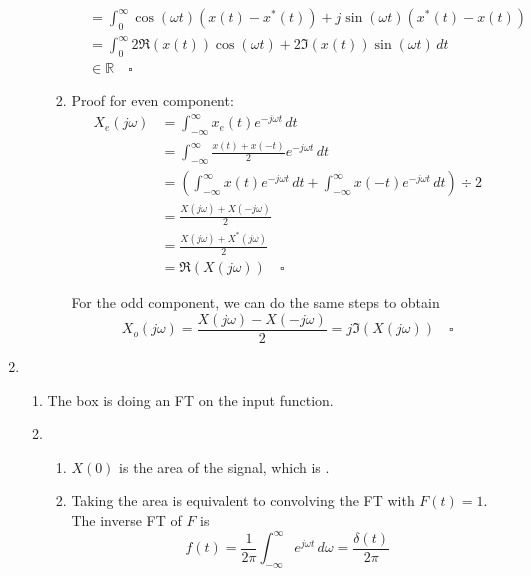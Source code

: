 \documentclass[12pt]{article}
\begin{document}
\begin{enumerate}
\begin{enumerate}
\begin{enumerate}
\[\begin{aligned}
                                                 & = \int_{0}^{\infty} \cos(\omega t)(x(t)-x^*(t))+j\sin(\omega t)(x^*(t)-x(t)) \\
                                                 & = \int_{0}^{\infty} 2\Re(x(t))\cos(\omega t)+2\Im(x(t))\sin(\omega t)\,dt    \\
                                                 & \in \mathbb{R}\quad\square
                                          \end{aligned}\]
                              \item Proof for even component:
                                    \begin{align*}
                                          X_e(j\omega)
                                           & = \int_{-\infty}^{\infty} x_e(t)e^{-j\omega t}\,dt                                                                     \\
                                           & = \int_{-\infty}^{\infty} \frac{x(t)+x(-t)}{2}e^{-j\omega t}\,dt                                                       \\
                                           & = \left(\int_{-\infty}^{\infty} x(t)e^{-j\omega t}\,dt + \int_{-\infty}^{\infty} x(-t)e^{-j\omega t}\,dt\right) \div 2 \\
                                           & = \frac{X(j\omega)+X(-j\omega)}{2}                                                                                     \\
                                           & = \frac{X(j\omega)+X^*(j\omega)}{2}                                                                                    \\
                                           & = \Re(X(j\omega))\quad\square
                                    \end{align*}

                                    For the odd component, we can do the same steps to obtain
                                    \[X_o(j\omega)=\frac{X(j\omega)-X(-j\omega)}{2}=j\Im(X(j\omega))\quad\square\]
                        \end{enumerate}
            \end{enumerate}
      \item \begin{enumerate}
                  \item The box is doing an FT on the input function.
                  \item \begin{enumerate}
                              \item $X(0)$ is the area of the signal, which is .
                              \item Taking the area is equivalent to convolving the FT with $F(t)=1$.
                                    The inverse FT of $F$ is \[f(t)=\frac{1}{2\pi}\int_{-\infty}^{\infty} e^{j\omega t}\,d\omega =\frac{\delta(t)}{2\pi}\]


\end{enumerate}
\end{enumerate}
\end{enumerate}
\end{document}
